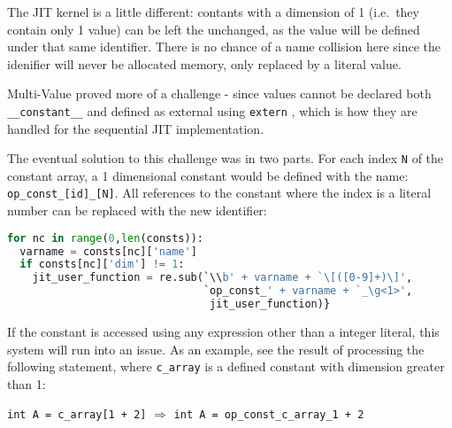 The JIT kernel is a little different: contants with a dimension of 1 (i.e.\ they contain only 1 value) can be left the unchanged, as the value will be defined under that same identifier. There is no chance of a name collision here since the idenifier will never be allocated memory, only replaced by a literal value.
\par
Multi-Value proved more of a challenge - since values cannot be declared both \verb|__constant__| and defined as external using \verb|extern| \cite[p126]{guide}, which is how they are handled for the sequential JIT implementation.
\par
The eventual solution to this challenge was in two parts. For each index \verb|N| of the constant array, a 1 dimensional constant would be defined with the name: \verb|op_const_[id]_[N]|. All references to the constant where the index is a literal number can be replaced with the new identifier:
\begin{lstlisting}[backgroundcolor = \color{lightgray!20}, language=Python]
for nc in range(0,len(consts)):
  varname = consts[nc]['name']
  if consts[nc]['dim'] != 1:
    jit_user_function = re.sub(`\\b' + varname + `\[([0-9]+)\]',
                               `op_const_' + varname + `_\g<1>',
                                jit_user_function)}
\end{lstlisting}

If the constant is accessed using any expression other than a integer literal, this system will run into an issue. As an example, see the result of processing the following statement, where \verb|c_array| is a defined constant with dimension greater than 1:
\begin{center}
\lstinline|int A = c_array[1 + 2]| \space{1cm}$\Rightarrow$\space{1cm} \lstinline |int A = op_const_c_array_1 + 2|
\end{center}

